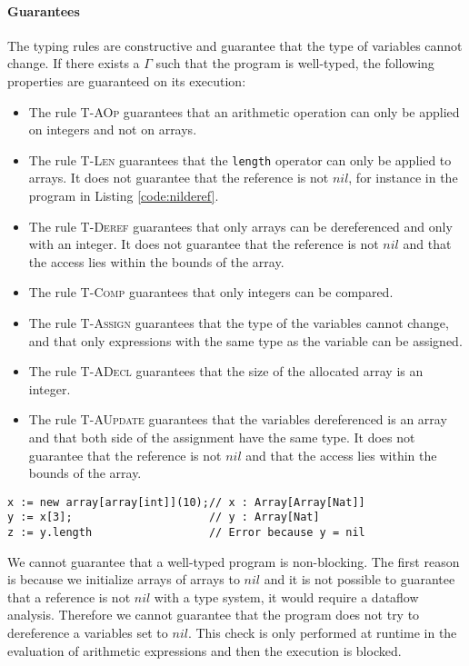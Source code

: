\documentclass{article}
\begin{document}
\paragraph{Guarantees}
The typing rules are constructive and guarantee that the type of variables cannot change.
If there exists a \(\Gamma\) such that the program is well-typed, the following properties are guaranteed on its execution:
\begin{itemize}
 \item The rule \textsc{T-AOp} guarantees that an arithmetic operation can only be applied on integers and not on arrays.
 \item The rule \textsc{T-Len} guarantees that the \texttt{length} operator can only be applied to arrays. It does not guarantee that the reference is not \(nil\), for instance in the program in Listing \ref{code:nilderef}.
 \item The rule \textsc{T-Deref} guarantees that only arrays can be dereferenced and only with an integer. It does not guarantee that the reference is not \(nil\) and that the access lies within the bounds of the array.
 \item The rule \textsc{T-Comp} guarantees that only integers can be compared.
 \item The rule \textsc{T-Assign} guarantees that the type of the variables cannot change, and that only expressions with the same type as the variable can be assigned. 
 \item The rule \textsc{T-ADecl} guarantees that the size of the allocated array is an integer.
 \item The rule \textsc{T-AUpdate} guarantees that the variables dereferenced is an array and that both side of the assignment have the same type. It does not guarantee that the reference is not \(nil\) and that the access lies within the bounds of the array.
\end{itemize}

\begin{lstlisting}[caption=Example of program dereferencing a nil reference., label=code:nilderef]
x := new array[array[int]](10);// x : Array[Array[Nat]]
y := x[3];                     // y : Array[Nat]
z := y.length                  // Error because y = nil

\end{lstlisting}

We cannot guarantee that a well-typed program is non-blocking.
The first reason is because we initialize arrays of arrays to \(nil\) and it is not possible to guarantee that a reference is not \(nil\) with a type system, it would require a dataflow analysis.
Therefore we cannot guarantee that the program does not try to dereference a variables set to \(nil\). This check is only performed at runtime in the evaluation of arithmetic expressions and then the execution is  blocked.
\end{document}
